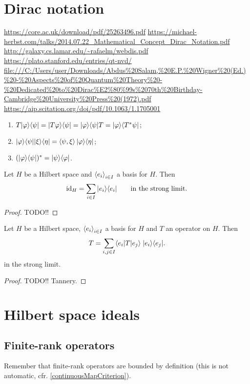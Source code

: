 \section{Dirac notation}
\url{https://core.ac.uk/download/pdf/25263496.pdf}
\url{https://michael-herbst.com/talks/2014.07.22_Mathematical_Concept_Dirac_Notation.pdf}
\url{http://galaxy.cs.lamar.edu/~rafaelm/webdis.pdf}
\url{https://plato.stanford.edu/entries/qt-nvd/}
\url{file:///C:/Users/user/Downloads/Abdus%20Salam,%20E.P.%20Wigner%20(Ed.)%20-%20Aspects%20of%20Quantum%20Theory%20-%20Dedicated%20to%20Dirac%E2%80%99s%2070th%20Birthday-Cambridge%20University%20Press%20(1972).pdf}
\url{https://aip.scitation.org/doi/pdf/10.1063/1.1705001}

\begin{lemma}
\begin{enumerate}
\item $T|\varphi\rangle\langle\psi| = |T\varphi\rangle\langle\psi| = |\varphi\rangle\langle\psi|T = |\varphi\rangle\langle T^*\psi|$;
\item $|\varphi\rangle\langle\psi||\xi\rangle\langle\eta| = \left\langle \psi, \xi \right\rangle|\varphi\rangle\langle\eta|$;
\item $(|\varphi\rangle\langle\psi|)^* = |\psi\rangle\langle\varphi|$.
\end{enumerate}
\end{lemma}

\begin{lemma}
Let $H$ be a Hilbert space and $\left\langle e_i \right\rangle_{i\in I}$ a basis for $H$. Then
\[ \operatorname{id}_H = \sum_{i\in I}|e_i\rangle\langle e_i| \qquad\text{in the strong limit.} \]
\end{lemma}
\begin{proof}
TODO!!
\end{proof}
\begin{lemma} \label{operatorBraketExpansion}
Let $H$ be a Hilbert space, $\left\langle e_i \right\rangle_{i\in I}$ a basis for $H$ and $T$ an operator on $H$. Then
\[ T = \sum_{i,j\in I}\braket[T]{e_i}{e_j}\; \ketbra{e_i}{e_j}. \]
in the strong limit.
\end{lemma}
\begin{proof}
TODO!! Tannery.
\end{proof}

\section{Hilbert space ideals}

\subsection{Finite-rank operators}
Remember that finite-rank operators are bounded by definition (this is not automatic, cfr. \ref{continuousMapCriterion}).


